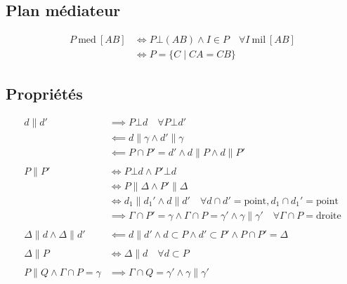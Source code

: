 \documentclass{article}
\newcommand{\mediateur}{\:\text{med}\:}
\newcommand{\milieu}{\:\text{mil}\:}
\begin{document}
\subsection{Plan médiateur}

\begin{equation*}
    \begin{split}
        P \mediateur [AB] &\iff P \bot (AB) \land I \in P \quad\forall I \milieu [AB]\\
                          &\iff P = \{ C \;|\; CA = CB \}
    \end{split}
\end{equation*}

\subsection{Propriétés}

\begin{equation*}
    \begin{split}
        d \parallel d' &\implies P \bot d \quad\forall P \bot d' \\
                       &\impliedby d \parallel \gamma \land d' \parallel \gamma \\
                       &\impliedby P \cap P' = d' \land d \parallel P \land d \parallel P' \\\\
        P \parallel P' &\iff P\bot d \land P' \bot d \\
                       &\iff P \parallel \Delta \land P' \parallel \Delta \\
                       &\iff d_1 \parallel d_1' \land d \parallel d' \quad\forall d \cap d' = \text{point}, d_1 \cap d_1' = \text{point} \\
                       &\implies \Gamma \cap P' = \gamma \land \Gamma \cap P = \gamma' \land \gamma \parallel \gamma' \quad\forall \Gamma \cap P = \text{droite} \\\\
        \Delta \parallel d \land \Delta \parallel d' &\impliedby d \parallel d' \land d \subset P \land d' \subset P' \land P \cap P' = \Delta \\\\
        \Delta \parallel P &\iff \Delta \parallel d \quad\forall d \subset P \\\\
        P \parallel Q \land \Gamma \cap P = \gamma &\implies \Gamma \cap Q = \gamma' \land \gamma \parallel \gamma'
    \end{split}
\end{equation*}
\end{document}
